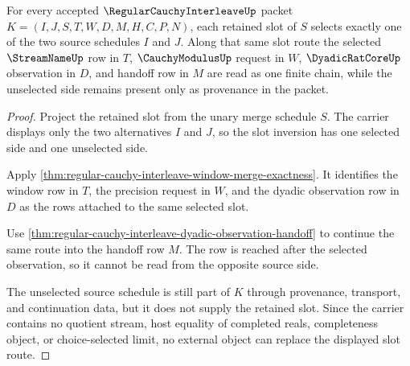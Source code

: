 \begin{theorem}
\label{thm:regular-cauchy-interleave-selected-slot-exhaustion}
For every accepted $\RegularCauchyInterleaveUp$ packet $K=(I,J,S,T,W,D,M,H,C,P,N)$, each retained slot of $S$ selects exactly one of the two source schedules $I$ and $J$. Along that same slot route the selected $\StreamNameUp$ row in $T$, $\CauchyModulusUp$ request in $W$, $\DyadicRatCoreUp$ observation in $D$, and handoff row in $M$ are read as one finite chain, while the unselected side remains present only as provenance in the packet.
\end{theorem}
\begin{proof}
Project the retained slot from the unary merge schedule $S$. The carrier displays only the two alternatives $I$ and $J$, so the slot inversion has one selected side and one unselected side.

Apply \autoref{thm:regular-cauchy-interleave-window-merge-exactness}. It identifies the window row in $T$, the precision request in $W$, and the dyadic observation row in $D$ as the rows attached to the same selected slot.

Use \autoref{thm:regular-cauchy-interleave-dyadic-observation-handoff} to continue the same route into the handoff row $M$. The row is reached after the selected observation, so it cannot be read from the opposite source side.

The unselected source schedule is still part of $K$ through provenance, transport, and continuation data, but it does not supply the retained slot. Since the carrier contains no quotient stream, host equality of completed reals, completeness object, or choice-selected limit, no external object can replace the displayed slot route.
\end{proof}

